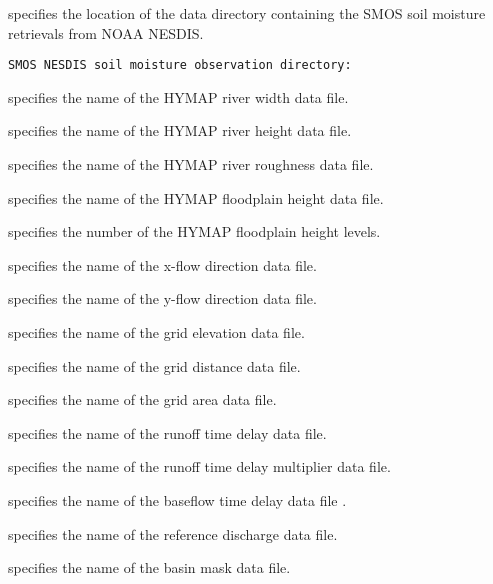  
  specifies
 the location of the data directory containing the SMOS soil
 moisture retrievals from NOAA NESDIS.
 

 \begin{Verbatim}[frame=single]
SMOS NESDIS soil moisture observation directory:
 \end{Verbatim}


 
 specifies the name of the HYMAP river width data file.

 specifies the name of the HYMAP river height data file. 

 specifies the name of the HYMAP river roughness data file. 

 specifies the name of the HYMAP floodplain height data file. 

 specifies the number of the HYMAP floodplain height levels. 

 specifies the name of the x-flow direction data file.

 specifies the name of the y-flow direction data file.

 specifies the name of the grid elevation data file.

 specifies the name of the grid distance data file.

 specifies the name of the grid area data file.

  

  

 specifies the name of the runoff time delay data file. 

 specifies the name of the runoff time delay multiplier data file.

 specifies the name of the baseflow time delay data file .

 specifies the name of the reference discharge data file.

 specifies the name of the basin mask data file.

